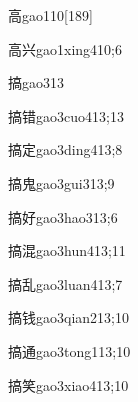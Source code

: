\begin{verbete}{高}{gao1}{10}[189]
\end{verbete}

\begin{verbete}{高兴}{gao1xing4}{10;6}
\end{verbete}

\begin{verbete}{搞}{gao3}{13}
\end{verbete}

\begin{verbete}{搞错}{gao3cuo4}{13;13}
\end{verbete}

\begin{verbete}{搞定}{gao3ding4}{13;8}
\end{verbete}

\begin{verbete}{搞鬼}{gao3gui3}{13;9}
\end{verbete}

\begin{verbete}{搞好}{gao3hao3}{13;6}
\end{verbete}

\begin{verbete}{搞混}{gao3hun4}{13;11}
\end{verbete}

\begin{verbete}{搞乱}{gao3luan4}{13;7}
\end{verbete}

\begin{verbete}{搞钱}{gao3qian2}{13;10}
\end{verbete}

\begin{verbete}{搞通}{gao3tong1}{13;10}
\end{verbete}

\begin{verbete}{搞笑}{gao3xiao4}{13;10}
\end{verbete}

